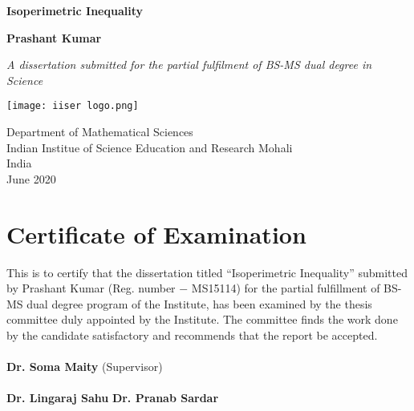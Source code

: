 \documentclass[oneside]{book}
\date{\today}
\begin{document}
\begin{titlepage}
    \begin{center}
        \vspace*{1cm}
            
        \Huge
        \textbf{Isoperimetric Inequality}
            
        \vspace{0.5cm}
        \LARGE
    
            
        \vspace{1.5cm}
            
        \textbf{Prashant Kumar}
            
        \vfill
            
        \textit{A dissertation submitted for the partial fulfilment of BS-MS dual degree in Science}          
        \vspace{0.9cm}
            
        \texttt{[image: iiser logo.png]}
            
        \Large
        Department of Mathematical Sciences\\
        Indian Institue of Science Education and Research Mohali\\
        India\\
        June 2020
            
    \end{center}
\end{titlepage}




\tableofcontents
\thispagestyle{empty}
\chapter*{Certificate of Examination}
This is to certify that the dissertation titled \enquote{Isoperimetric Inequality} submitted by Prashant Kumar (Reg. number $-$ MS15114) for the partial fulfillment of BS-MS dual degree program of the Institute, has been examined by the thesis committee duly appointed by the Institute. The committee finds the work done by the candidate satisfactory and recommends that the report be accepted.\\\\
\textbf{Dr. Soma Maity} (Supervisor)\\
\\
 \textbf{Dr. Lingaraj Sahu}  \hfill           \textbf{ Dr. Pranab Sardar}\\
\\
\\
\thispagestyle{empty}
\end{document}
